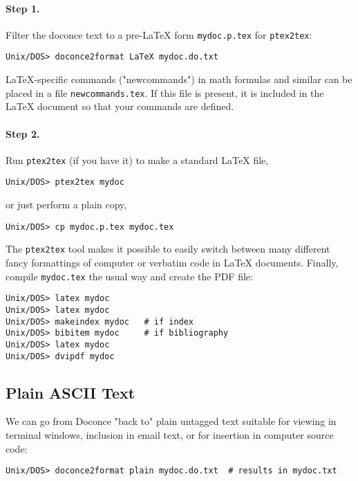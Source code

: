 \documentclass{article}
\begin{document}
\paragraph{Step 1.}
Filter the doconce text to a pre-{\LaTeX} form {\fontsize{10pt}{10pt}\verb!mydoc.p.tex!} for
     {\fontsize{10pt}{10pt}\verb!ptex2tex!}:
\begin{Verbatim}[fontsize=\fontsize{9pt}{9pt},tabsize=8,baselinestretch=0.85,
fontfamily=tt,xleftmargin=7mm]
Unix/DOS> doconce2format LaTeX mydoc.do.txt
\end{Verbatim}
\noindent
{\LaTeX}-specific commands ("newcommands") in math formulas and similar
can be placed in a file {\fontsize{10pt}{10pt}\verb!newcommands.tex!}. If this file is present,
it is included in the {\LaTeX} document so that your commands are
defined.

\paragraph{Step 2.}
Run {\fontsize{10pt}{10pt}\verb!ptex2tex!} (if you have it) to make a standard {\LaTeX} file,
\begin{Verbatim}[fontsize=\fontsize{9pt}{9pt},tabsize=8,baselinestretch=0.85,
fontfamily=tt,xleftmargin=7mm]
Unix/DOS> ptex2tex mydoc
\end{Verbatim}
\noindent
or just perform a plain copy,
\begin{Verbatim}[fontsize=\fontsize{9pt}{9pt},tabsize=8,baselinestretch=0.85,
fontfamily=tt,xleftmargin=7mm]
Unix/DOS> cp mydoc.p.tex mydoc.tex
\end{Verbatim}
\noindent
The {\fontsize{10pt}{10pt}\verb!ptex2tex!} tool makes it possible to easily switch between many
different fancy formattings of computer or verbatim code in {\LaTeX}
documents.
Finally, compile {\fontsize{10pt}{10pt}\verb!mydoc.tex!} the usual way and create the PDF file:
\begin{Verbatim}[fontsize=\fontsize{9pt}{9pt},tabsize=8,baselinestretch=0.85,
fontfamily=tt,xleftmargin=7mm]
Unix/DOS> latex mydoc
Unix/DOS> latex mydoc
Unix/DOS> makeindex mydoc   # if index
Unix/DOS> bibitem mydoc     # if bibliography
Unix/DOS> latex mydoc
Unix/DOS> dvipdf mydoc
\end{Verbatim}
\noindent

\subsection{Plain ASCII Text}

We can go from Doconce "back to" plain untagged text suitable for viewing
in terminal windows, inclusion in email text, or for insertion in
computer source code:
\begin{Verbatim}[fontsize=\fontsize{9pt}{9pt},tabsize=8,baselinestretch=0.85,
fontfamily=tt,xleftmargin=7mm]
Unix/DOS> doconce2format plain mydoc.do.txt  # results in mydoc.txt
\end{Verbatim}
\noindent
\end{document}
